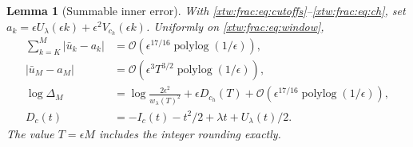 \documentclass[11pt]{article}
\newtheorem{lemma}[theorem]{Lemma}
\theoremstyle{remark}\newtheorem{remark}[theorem]{Remark}
\newcommand{\OO}{\mathcal O}
\begin{document}
\begin{lemma}[Summable inner error]\label{xtw:frac:lem:inner}
With \eqref{xtw:frac:eq:cutoffs}--\eqref{xtw:frac:eq:ch}, set
$a_k=\epsilon U_\lambda(\epsilon k)+\epsilon^2V_{c_h}(\epsilon k)$.
Uniformly on \eqref{xtw:frac:eq:window},
\begin{align}
 \sum_{k=K}^M|\bar u_k-a_k|
      &=\OO(\epsilon^{17/16}\operatorname{polylog}(1/\epsilon)),
                                                        \label{xtw:frac:eq:innersum}\\
 |\bar u_M-a_M|&=\OO(\epsilon^3T^{3/2}\operatorname{polylog}(1/\epsilon)),
                                                        \label{xtw:frac:eq:innerend}\\
 \log\Delta_M&=\log\frac{2\epsilon^2}{w_\lambda(T)^2}
                    +\epsilon D_{c_h}(T)
                    +\OO(\epsilon^{17/16}\operatorname{polylog}(1/\epsilon)),
                                                        \label{xtw:frac:eq:innersep}\\
 D_c(t)&=-I_c(t)-t^2/2+\lambda t+U_\lambda(t)/2.
                                                        \label{xtw:frac:eq:Ddefinition}
\end{align}
The value $T=\epsilon M$ includes the integer rounding exactly.
\end{lemma}
\end{document}

